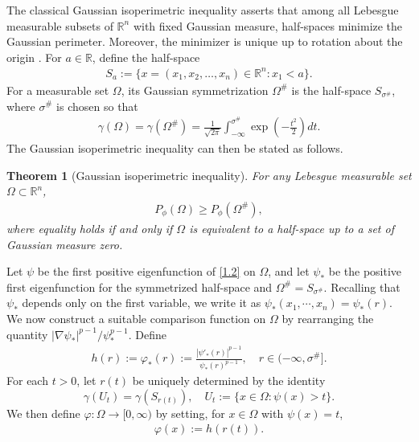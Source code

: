 \documentclass[11pt,leqno]{amsart}
\newtheorem{theorem}{Theorem}[section]\newtheorem{thm}[theorem]{Theorem}
\numberwithin{equation}{section}
\begin{document}
The classical Gaussian isoperimetric inequality\cite{Borell,Sudakov74,Ehrhard84} asserts that among all Lebesgue measurable subsets of $\mathbb{R}^n$ with  fixed Gaussian measure, half-spaces minimize the Gaussian perimeter.  Moreover, the minimizer is unique up to rotation about the origin \cite{Carlen01,Cianchi11}. For $a\in\mathbb{R}$, define the half-space
\begin{align*}
S_a:=\{x=(x_1,x_2,\dots,x_n)\in\mathbb{R}^n:x_1<a\}.
\end{align*}
For a measurable set 
$\Omega$, its Gaussian symmetrization $\Omega^{\#}$ is  the half-space $S_{\sigma^{\#}}$,
where $\sigma^{\#}$ is chosen so that
\begin{align*}
\gamma(\Omega)=\gamma(\Omega^{\#})
=\frac{1}{\sqrt{2\pi}}\int_{-\infty}^{\sigma^{\#}}\exp\left(-\frac{t^2}{2}\right)dt.
\end{align*}
The Gaussian isoperimetric inequality can then be stated as follows.
\begin{theorem}[Gaussian isoperimetric inequality]\label{thmiso}
For any Lebesgue measurable set $\Omega\subset\mathbb{R}^n$,
\begin{align*}
P_{\phi }(\Omega)\ge P_{\phi }(\Omega^{\#}),
\end{align*}
where equality holds if and only if $\Omega$   is equivalent to a half-space up to a set of Gaussian measure zero.
\end{theorem}


Let $\psi$ be the first positive eigenfunction of \eqref{1.2} on $\Omega$, and let $\psi_*$ be the positive first eigenfunction for the symmetrized half-space and $\Omega^{\#}=S_{\sigma^{\#}}$. Recalling that $\psi_*$ depends only on the first variable, we write it as
$\psi_*(x_{1},\cdots,x_{n})=\psi_{*}(r)$. We now construct a suitable comparison function  on $\Omega$ by rearranging  the quantity $|\nabla \psi_*|^{p-1}/\psi_*^{p-1}$. Define
\begin{align*}
h(r) := \varphi_*(r) := \frac{|\psi'_*(r)|^{p-1}}{\psi_*(r)^{p-1}}, \quad r \in (-\infty,\sigma^\#].
\end{align*}
For each $t>0$, let $r(t)$ be uniquely determined by the identity 
 $$
 \gamma(U_t)=\gamma(S_{r(t)}), \quad U_t:=\{x\in \Omega: \psi(x)> t
 \}.
 $$
  We then define $\varphi: \Omega\to [0, \infty)$ by setting, for $x\in \Omega$ with  $\psi(x) = t$,
\begin{align*}
\varphi(x) := h(r(t)).
\end{align*}
\end{document}
